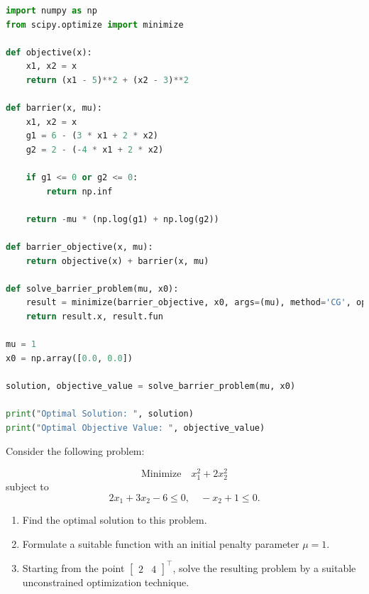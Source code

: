 \documentclass{article}
\begin{document}
\begin{lstlisting}[language=Python]
import numpy as np
from scipy.optimize import minimize

def objective(x):
    x1, x2 = x
    return (x1 - 5)**2 + (x2 - 3)**2

def barrier(x, mu):
    x1, x2 = x
    g1 = 6 - (3 * x1 + 2 * x2)
    g2 = 2 - (-4 * x1 + 2 * x2)
    
    if g1 <= 0 or g2 <= 0:
        return np.inf
    
    return -mu * (np.log(g1) + np.log(g2))

def barrier_objective(x, mu):
    return objective(x) + barrier(x, mu)

def solve_barrier_problem(mu, x0):
    result = minimize(barrier_objective, x0, args=(mu), method='CG', options={'disp': True})
    return result.x, result.fun

mu = 1
x0 = np.array([0.0, 0.0]) 

solution, objective_value = solve_barrier_problem(mu, x0)

print("Optimal Solution: ", solution)
print("Optimal Objective Value: ", objective_value)
\end{lstlisting}

\begin{question*}[7]
    Consider the following problem:

    \[
    \text{Minimize} \quad x_1^2 + 2x_2^2
    \]
    subject to
    \[
    2x_1 + 3x_2 - 6 \leq 0, \quad -x_2 + 1 \leq 0.
    \]

    \begin{enumerate}[label=(\alph*)]
        \item Find the optimal solution to this problem.
        \item Formulate a suitable function with an initial penalty parameter \( \mu = 1 \).
        \item Starting from the point \( \begin{bmatrix} 2 & 4 \end{bmatrix}^\top \), solve the resulting problem by a suitable unconstrained optimization technique.
    \end{enumerate}
\end{question*}
\end{document}
